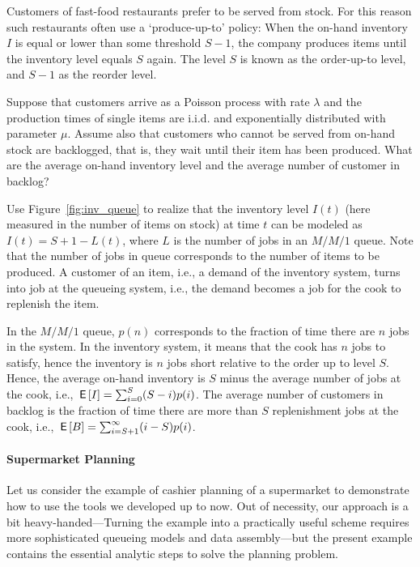 \begin{exercise}\label{ex:7}
Customers of fast-food restaurants prefer to be served from stock. For this reason such
restaurants often use a `produce-up-to' policy: When the on-hand inventory $I$ is equal or lower than some threshold $S-1$, the company produces items until the inventory level equals $S$ again. The level $S$ is known as the order-up-to level, and $S-1$ as the reorder level.

Suppose that customers arrive as a Poisson process with rate $\lambda$
and the production times of single items are i.i.d. and exponentially
distributed with parameter $\mu$. Assume also that customers who
cannot be served from on-hand stock are backlogged, that is, they wait
until their item has been produced. What are the average on-hand
inventory level and the average number of customer in backlog?
\begin{hint}
Use Figure~\ref{fig:inv_queue} to realize that the inventory level $I(t)$ (here measured in the number of items on stock) at time $t$ can be
  modeled as $I(t) = S+1-L(t)$, where $L$ is the number of jobs in an
  $M/M/1$ queue. Note that the number of jobs in queue corresponds to the number of items to be produced. A customer of an item, i.e., a demand of the inventory system, turns into  job at the queueing system, i.e., the demand becomes a job for the cook to replenish the item.
\end{hint}
  \begin{solution}
In the $M/M/1$ queue, $p(n)$ corresponds to the fraction of time there are $n$ jobs in the system. In the inventory system, it means that the cook has $n$ jobs to satisfy, hence the inventory is $n$ jobs short relative to the order up to level $S$.  Hence, the average on-hand inventory is $S$ minus the average number of jobs at the cook, i.e., $\,\mathsf{E}\left[I\right] = \sum_{i=0}^{S} (S-i) p(i)$. The average number of customers in backlog is the fraction of time there are more than $S$ replenishment jobs at the cook, i.e., $\,\mathsf{E}\left[B\right] = \sum_{i=S+1}^\infty (i-S) p(i)$. 
  \end{solution}
\end{exercise}


\paragraph{Supermarket Planning}

Let us consider the example of cashier planning of a supermarket to
demonstrate how to use the tools we developed up to now. Out of
necessity, our approach is a bit heavy-handed---Turning the example
into a practically useful scheme requires more sophisticated queueing
models and data assembly---but the present example contains the
essential analytic steps to solve the planning problem.

